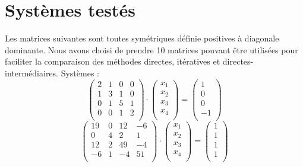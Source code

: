 \documentclass{report}
\begin{document}
	\newpage
	\section{Systèmes testés}
	  Les matrices suivantes sont toutes symétriques définie positives à diagonale dominante. Nous avons choisi de prendre 10 matrices pouvant être utilisées pour
	  faciliter la comparaison des méthodes directes, itératives et directes-intermédiaires.
	          Systèmes :
        \begin{equation}
        \begin{pmatrix}
		2 & 1 & 0 & 0 \\
		1 & 3 & 1 & 0 \\
		0 & 1 & 5 & 1 \\
		0 & 0 & 1 & 2 \\
        \end{pmatrix}
        \cdot
        \begin{pmatrix}
          x_1 \\
          x_2 \\
          x_3 \\
          x_4 \\
        \end{pmatrix}
        =
        \begin{pmatrix}
		1 \\
		0 \\
		0 \\
		-1 \\
        \end{pmatrix}
        \label{syst1} %
        \end{equation}
        \begin{equation}
        \begin{pmatrix}
		19 & 0 & 12 & -6 \\
		0 & 4 & 2 & 1 \\
		12 & 2 & 49 & -4 \\
		-6 & 1 & -4 & 51 \\
        \end{pmatrix}
        \cdot
        \begin{pmatrix}
          x_1 \\
          x_2 \\
          x_3 \\
          x_4 \\
        \end{pmatrix}
        =
        \begin{pmatrix}
		1 \\
		1 \\
		1 \\
		1 \\
        \end{pmatrix}
        \label{syst2}
        \end{equation}
\end{document}
